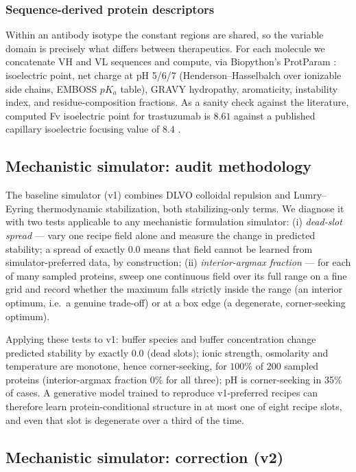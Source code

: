 \documentclass[twocolumn,10pt]{article}
\begin{document}
\subsubsection{Sequence-derived protein descriptors}
Within an antibody isotype the constant regions are shared, so the variable
domain is precisely what differs between therapeutics. For each molecule we
concatenate VH and VL sequences and compute, via Biopython's ProtParam
\cite{biopython}: isoelectric point, net charge at pH 5/6/7 (Henderson--Hasselbalch
over ionizable side chains, EMBOSS $pK_a$ table), GRAVY hydropathy, aromaticity,
instability index, and residue-composition fractions. As a sanity check against
the literature, computed Fv isoelectric point for trastuzumab is $8.61$ against a
published capillary isoelectric focusing value of $8.4$ \cite{trastuzumab_pi}.

\subsection{Mechanistic simulator: audit methodology}
\label{sec:simaudit}

The baseline simulator (v1) combines DLVO colloidal repulsion and Lumry--Eyring
thermodynamic stabilization, both stabilizing-only terms. We diagnose it with two
tests applicable to any mechanistic formulation simulator: (i) \emph{dead-slot
spread} --- vary one recipe field alone and measure the change in predicted
stability; a spread of exactly $0.0$ means that field cannot be learned from
simulator-preferred data, by construction; (ii) \emph{interior-argmax fraction}
--- for each of many sampled proteins, sweep one continuous field over its full
range on a fine grid and record whether the maximum falls strictly inside the
range (an interior optimum, i.e.\ a genuine trade-off) or at a box edge (a
degenerate, corner-seeking optimum).

Applying these tests to v1: buffer species and buffer concentration change
predicted stability by exactly $0.0$ (dead slots); ionic strength, osmolarity and
temperature are monotone, hence corner-seeking, for $100\%$ of 200 sampled
proteins (interior-argmax fraction $0\%$ for all three); pH is corner-seeking in
35\% of cases. A generative model trained to reproduce v1-preferred recipes can
therefore learn protein-conditional structure in at most one of eight recipe
slots, and even that slot is degenerate over a third of the time.

\subsection{Mechanistic simulator: correction (v2)}
\label{sec:simv2}
\end{document}
